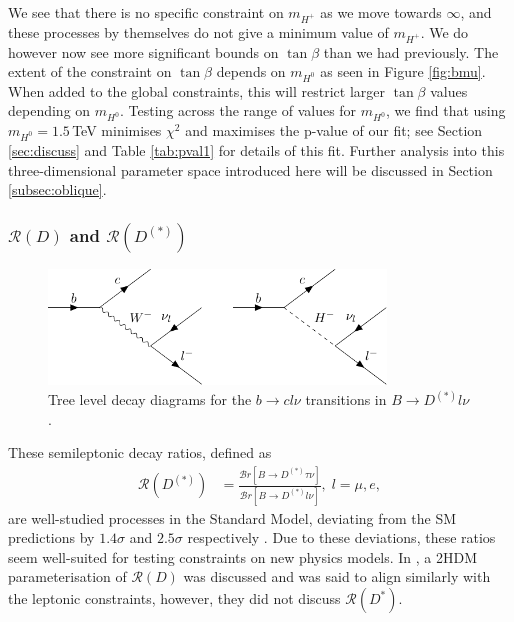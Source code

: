 \documentclass[a4paper,12pt]{article}
\begin{document}
We see that there is no specific constraint on $m_{H^+}$ as we move towards $\infty$, and these processes by themselves do not give a minimum value of $m_{H^+}$. 
We do however now see more significant bounds on $\tan\beta$ than we had previously. 
The extent of the constraint on $\tan\beta$ depends on $m_{H^0}$ as seen in Figure \ref{fig:bmu}.
When added to the global constraints, this will restrict larger $\tan\beta$ values depending on $m_{H^0}$.
Testing across the range of values for $m_{H^0}$, we find that using $m_{H^0}=1.5\,$TeV minimises $\chi^2$ and maximises the p-value of our fit; see Section \ref{sec:discuss} and Table \ref{tab:pval1} for details of this fit.
Further analysis into this three-dimensional parameter space introduced here will be discussed in Section \ref{subsec:oblique}.

\subsubsection{$\mathcal{R}(D)$ and $\mathcal{R}(D^{(*)})$}
\begin{figure}[H]
    \centering
    \includegraphics[width=0.8\textwidth]{bclnu.pdf}
    \caption{\label{fig:bclnu}Tree level decay diagrams for the $b\to cl\nu$ transitions in $B\to D^{(*)}l\nu$.}
\end{figure}
These semileptonic decay ratios, defined as
\begin{align}
    \mathcal{R}(D^{(*)}) &=\frac{\mathcal{B}r[B\to D^{(*)}\tau\nu]}{\mathcal{B}r[B\to D^{(*)}l\nu]},\; l = \mu,e,
\end{align}
are well-studied processes in the Standard Model, deviating from the SM predictions by $1.4\sigma$ and $2.5\sigma$ respectively \cite{pdg}. 
Due to these deviations, these ratios seem well-suited for testing constraints on new physics models. 
In \cite{desc}, a 2HDM parameterisation of $\mathcal{R}(D)$ was discussed and was said to align similarly with the leptonic constraints, however, they did not discuss $\mathcal{R}(D^*)$. 
\end{document}

